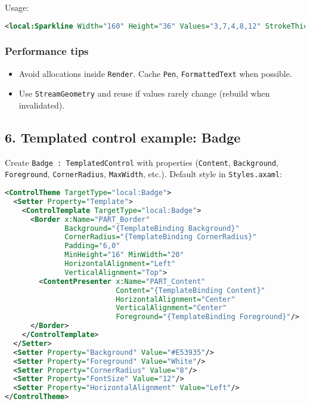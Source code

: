 Usage:

\begin{lstlisting}[language=XML]
<local:Sparkline Width="160" Height="36" Values="3,7,4,8,12" StrokeThickness="2"/>
\end{lstlisting}

\subsubsection{Performance tips}\label{performance-tips-1}

\begin{itemize}
\tightlist
\item
  Avoid allocations inside \passthrough{\lstinline!Render!}. Cache
  \passthrough{\lstinline!Pen!}, \passthrough{\lstinline!FormattedText!}
  when possible.
\item
  Use \passthrough{\lstinline!StreamGeometry!} and reuse if values
  rarely change (rebuild when invalidated).
\end{itemize}

\subsection{6. Templated control example:
Badge}\label{templated-control-example-badge}

Create \passthrough{\lstinline!Badge : TemplatedControl!} with
properties (\passthrough{\lstinline!Content!},
\passthrough{\lstinline!Background!},
\passthrough{\lstinline!Foreground!},
\passthrough{\lstinline!CornerRadius!},
\passthrough{\lstinline!MaxWidth!}, etc.). Default style in
\passthrough{\lstinline!Styles.axaml!}:

\begin{lstlisting}[language=XML]
<ControlTheme TargetType="local:Badge">
  <Setter Property="Template">
    <ControlTemplate TargetType="local:Badge">
      <Border x:Name="PART_Border"
              Background="{TemplateBinding Background}"
              CornerRadius="{TemplateBinding CornerRadius}"
              Padding="6,0"
              MinHeight="16" MinWidth="20"
              HorizontalAlignment="Left"
              VerticalAlignment="Top">
        <ContentPresenter x:Name="PART_Content"
                          Content="{TemplateBinding Content}"
                          HorizontalAlignment="Center"
                          VerticalAlignment="Center"
                          Foreground="{TemplateBinding Foreground}"/>
      </Border>
    </ControlTemplate>
  </Setter>
  <Setter Property="Background" Value="#E53935"/>
  <Setter Property="Foreground" Value="White"/>
  <Setter Property="CornerRadius" Value="8"/>
  <Setter Property="FontSize" Value="12"/>
  <Setter Property="HorizontalAlignment" Value="Left"/>
</ControlTheme>
\end{lstlisting}

